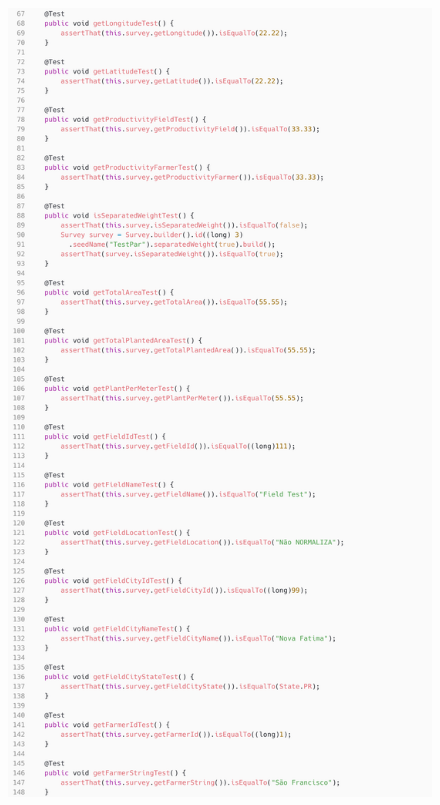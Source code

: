 \begin{figure}[H]
	\centering
	\includegraphics[scale=0.14]{dados/figuras/surveyTest1.png}
\end{figure}

